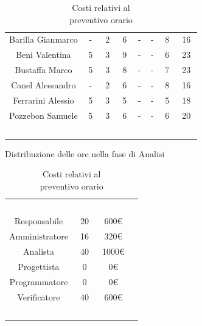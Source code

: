 \begin{table}[h!]
\begin{minipage}[c]{0.53\textwidth}
\begin{tabular}{>{\raggedright\arraybackslash}c|cccccc|c}
		\rowcolor[RGB]{216, 235, 171}
	    	Barilla Gianmarco & - & 2 & 6 & - & - & 8& 16		\\[4pt]
	    \rowcolor[RGB]{233, 245, 206}
	    	Beni Valentina & 5 & 3 & 9 & - & - & 6& 23			\\[4pt]
	    \rowcolor[RGB]{216, 235, 171}
	    	Bustaffa Marco & 5 & 3 & 8 & - & - & 7& 23			\\[4pt]
        \rowcolor[RGB]{233, 245, 206}
	    	Canel Alessandro & - & 2 & 6 & - & - & 8& 16			\\[4pt]
        \rowcolor[RGB]{216, 235, 171}
	    	Ferrarini Alessio & 5 & 3 & 5 & - & - & 5& 18		\\[4pt]
        \rowcolor[RGB]{233, 245, 206}
	    	Pozzebon Samuele & 5 & 3 & 6 & - & - & 6& 20			\\[4pt]
		\rowcolor[RGB]{47, 106, 73}
			\textcolor{white}{Totale Ruolo} & \textcolor{white}{20} & \textcolor{white}{16} & \textcolor{white}{40} 
			& \textcolor{white}{0} & \textcolor{white}{0} & \textcolor{white}{40}
			& \textcolor{white}{116} \\[4pt]	
    \end{tabular}
    \caption{Distribuzione delle ore nella fase di Analisi}
\end{minipage}
\hfill
\begin{minipage}{0.33\textwidth}
	\centering
	\begin{tabular}{cccc}
	    \rowcolor[RGB]{33, 73, 50}
	    \textcolor{white}{\textbf{Ruolo}} & \textcolor{white}{\textbf{Ore}} & \textcolor{white}{\textbf{Costo}}\\[4pt]
	    \rowcolor[RGB]{216, 235, 171}
	    Responsabile & 20 & 600\euro\\[4pt]
	    \rowcolor[RGB]{233, 245, 206}
	    Amministratore & 16 & 320\euro\\[4pt]
        \rowcolor[RGB]{216, 235, 171}
	    Analista & 40 & 1000\euro\\[4pt]
	    \rowcolor[RGB]{233, 245, 206}
	    Progettista & 0 & 0\euro\\[4pt]
        \rowcolor[RGB]{216, 235, 171}
	    Programmatore & 0 & 0\euro\\[4pt]
	    \rowcolor[RGB]{233, 245, 206}
	    Verificatore & 40 & 600\euro\\[4pt]
		\rowcolor[RGB]{47, 106, 73}
			\textcolor{white}{Totale} & \textcolor{white}{116} & \textcolor{white}{2520\euro}\\[4pt]	
    \end{tabular}	
	\caption{Costi relativi al \\ preventivo orario}

\end{minipage}
\end{table}

